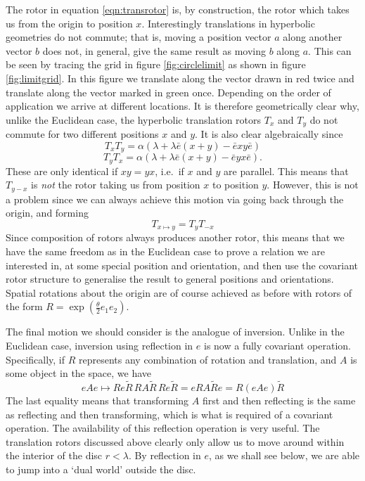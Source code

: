 The rotor in equation \ref{eqn:transrotor} is, by construction, the rotor 
which takes us from the origin to position $x$. Interestingly translations in
hyperbolic geometries do not commute; that is, moving a position
vector $a$ along another vector $b$ does not, in general, give the same result
as moving $b$ along $a$. This can be seen by tracing the grid
in figure \ref{fig:circlelimit} as shown in figure \ref{fig:limitgrid}.
In this figure we translate along the vector drawn in red twice and translate
along the vector marked in green once. Depending on the order of application
we arrive at different locations.
It is therefore geometrically clear why,
unlike the Euclidean case, the hyperbolic translation rotors
$T_x$ and $T_y$ do not commute
for two different positions $x$ and $y$. 
It is also clear algebraically since
\[
T_xT_y = \alpha(\lambda + \lambda\bar{e}(x+y) - \bar{e}xy\bar{e})
\]
\[
T_yT_x = \alpha(\lambda + \lambda\bar{e}(x+y) - \bar{e}yx\bar{e}).
\]
These are only identical if $xy = yx$, i.e.\ if $x$ and $y$ are parallel.
This means that
$T_{y-x}$ is {\em not} the rotor taking us from
position $x$ to position $y$. However, this is not a
problem since we can always achieve this motion via
going back through the origin, and forming
%
\begin{equation}
T_{x \mapsto y} = T_y T_{-x}
\end{equation}
%
Since composition of rotors always produces another
rotor, this means that we have the same freedom as in the
Euclidean case to prove a relation we are interested in,
at some special position and orientation, and then use
the covariant rotor structure to generalise the result to
general positions and orientations. Spatial rotations about the origin are
of course achieved as before with rotors of the form
$R=\exp\left(\frac{\theta}{2}e_1 e_2\right)$.

The final motion we should consider is the analogue of
inversion. Unlike in the Euclidean case, inversion using
reflection in $e$ is now a fully covariant operation.
Specifically, if $R$ represents any combination of
rotation and translation, and $A$ is some object in the
space, we have
%
\begin{equation}
eAe \mapsto Re\tilde{R}\, RA\tilde{R}\, Re\tilde{R} = e
RA\tilde{R} e = R(eAe) \tilde{R}
\end{equation}
%
The last equality means that transforming $A$ first and
then reflecting is the same as reflecting and then
transforming, which is what is required of a covariant
operation. The availability of this reflection operation
is very useful. The translation rotors discussed above
clearly only allow us to move around within the interior
of the disc $r<\lambda$. By reflection in $e$, as we
shall see below, we are able to jump into a `dual world'
outside the disc.

